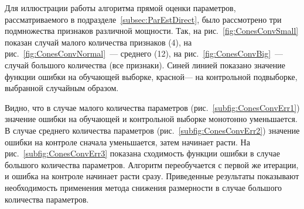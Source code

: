 \documentclass{elsarticle}
\begin{document}
Для иллюстрации работы алгоритма прямой оценки параметров, рассматриваемого в подразделе~\ref{subsec:ParEstDirect}, было рассмотрено три подмножества признаков различной мощности. Так, на рис.~\ref{fig:ConesConvSmall} показан случай малого количества признаков (4), на рис.~\ref{fig:ConesConvNormal}~--- среднего (12), на рис.~\ref{fig:ConesConvBig}~--- случай большого количества (все признаки). Синей линией показано значение функции ошибки на обучающей выборке, красной--- на контрольной подвыборке, выбранной случайным образом.

Видно, что в случае малого количества параметров (рис.~\ref{subfig:ConesConvErr1}) значение ошибки на обучающей и контрольной выборке монотонно уменьшается. В случае среднего количества параметров (рис.~\ref{subfig:ConesConvErr2}) значение ошибки на контроле сначала уменьшается, затем начинает расти.
На рис.~\ref{subfig:ConesConvErr3} показана сходимость функции ошибки в случае большого количества параметров. Алгоритм переобучается с первой же итерации, и ошибка на контроле начинает расти сразу. Приведенные результаты показывают необходимость применения метода снижения размерности в случае большого количества параметров.
\end{document}
